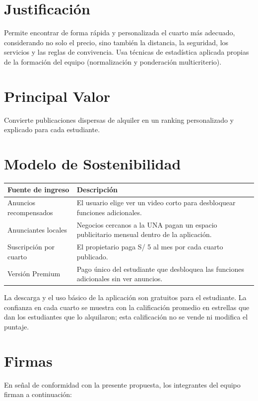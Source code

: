 \documentclass[11pt,a4paper]{article}
\begin{document}
\section{Justificación}
Permite encontrar de forma rápida y personalizada el cuarto más adecuado, considerando no solo el precio, sino también la distancia, la seguridad, los servicios y las reglas de convivencia. Usa técnicas de estadística aplicada propias de la formación del equipo (normalización y ponderación multicriterio).

\section{Principal Valor}
Convierte publicaciones dispersas de alquiler en un ranking personalizado y explicado para cada estudiante.

\section{Modelo de Sostenibilidad}
{\small
\noindent\begin{tabularx}{\textwidth}{@{}P{4.2cm} L@{}}
\toprule
{}
\textbf{Fuente de ingreso} & \textbf{Descripción} \\
\midrule
Anuncios recompensados & El usuario elige ver un video corto para desbloquear funciones adicionales. \\
Anunciantes locales & Negocios cercanos a la UNA pagan un espacio publicitario mensual dentro de la aplicación. \\
Suscripción por cuarto & El propietario paga S/ 5 al mes por cada cuarto publicado. \\
Versión Premium & Pago único del estudiante que desbloquea las funciones adicionales sin ver anuncios. \\
\bottomrule
\end{tabularx}
}

\vspace{0.1cm}
\noindent La descarga y el uso básico de la aplicación son gratuitos para el estudiante. La confianza en cada cuarto se muestra con la calificación promedio en estrellas que dan los estudiantes que lo alquilaron; esta calificación no se vende ni modifica el puntaje.

\section{Firmas}
\noindent En señal de conformidad con la presente propuesta, los integrantes del equipo firman a continuación:
\end{document}
